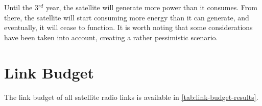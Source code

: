 Until the 3$^{rd}$ year, the satellite will generate more power than it consumes. From there, the satellite will start consuming more energy than it can generate, and eventually, it will cease to function. It is worth noting that some considerations have been taken into account, creating a rather pessimistic scenario.


\section{Link Budget}

The link budget of all satellite radio links is available in \autoref{tab:link-budget-results}.

